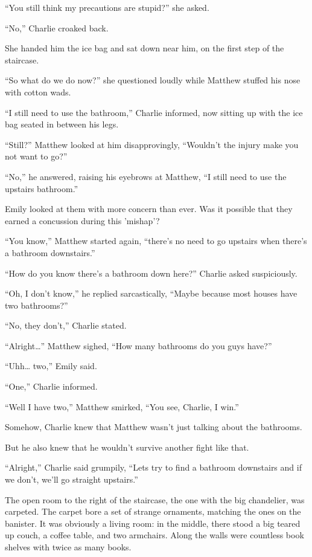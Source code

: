 “You still think my precautions are stupid?” she asked.

“No,” Charlie croaked back.

She handed him the ice bag and sat down near him, on the first step of the staircase.

“So what do we do now?” she questioned loudly while Matthew stuffed his nose with  cotton wads.

“I still need to use the bathroom,” Charlie informed, now sitting up with the ice bag seated in between his legs.

“Still?” Matthew looked at him disapprovingly, “Wouldn't the injury make you not want to go?”

“No,” he answered, raising his eyebrows at Matthew, “I still need to use the upstairs bathroom.”

Emily looked at them with more concern than ever. Was it possible that they earned a concussion during this 'mishap'?

“You know,” Matthew started again, “there's no need to go upstairs when there's a bathroom downstairs.”

“How do you know there's a bathroom down here?” Charlie asked suspiciously.

“Oh, I don't know,” he replied sarcastically, “Maybe because most houses have two bathrooms?”

“No, they don't,” Charlie stated.

“Alright…” Matthew sighed, “How many bathrooms do you guys have?”

“Uhh… two,” Emily said.

“One,” Charlie informed.

“Well I have two,” Matthew smirked, “You see, Charlie, I win.”

Somehow, Charlie knew that Matthew wasn't just talking about the bathrooms.

But he also knew that he wouldn't survive another fight like that.

“Alright,” Charlie said grumpily, “Lets try to find a bathroom downstairs and if we don't, we'll go straight upstairs.”

\bigskip

The open room to the right of the staircase, the one with the big chandelier, was carpeted. The carpet bore a set of strange ornaments, matching the ones on the banister. It was obviously a living room: in the middle, there stood a big teared up couch, a coffee table, and two armchairs. Along the walls were countless book shelves with twice as many books.

